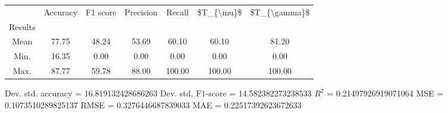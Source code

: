 \begin{tabular}{|c|c|c|c|c|c|c|}
\toprule
{} &  Accuracy &  F1 score &  Precision &  Recall &  \$T\_\{\textbackslash mu\}\$ &  \$T\_\{\textbackslash gamma\}\$ \\
Results &           &           &            &         &            &               \\
\hline
Mean    &     77.75 &     48.24 &      53.69 &   60.10 &      60.10 &         81.20 \\
Min.    &     16.35 &      0.00 &       0.00 &    0.00 &       0.00 &          0.00 \\
Max.    &     87.77 &     59.78 &      88.00 &  100.00 &     100.00 &        100.00 \\
\bottomrule
\end{tabular}

 Dev. std. accuracy = 16.819132428686263
 Dev. std. F1-score = 14.582382273238533
 $R^2$ = 0.21497926919071064
 MSE = 0.1073510289825137
 RMSE = 0.3276446687839033
 MAE = 0.22517392623672633